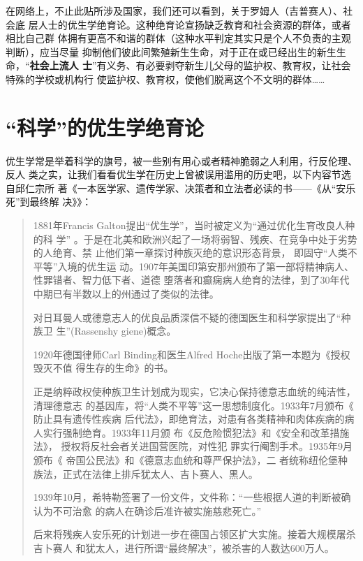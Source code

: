 在网络上，不止此贴所涉及国家，我们还可以看到，关于罗姆人（吉普赛人）、社会底
层人士的优生学绝育论。这种绝育论宣扬缺乏教育和社会资源的群体，或者相比自己群
体拥有更高不和谐的群体（这种水平判定其实只是个人不负责的主观判断），应当尽量
抑制他们彼此间繁殖新生生命，对于正在或已经出生的新生生命，“\textbf{社会上流人
  士}”有义务、有必要剥夺新生儿父母的监护权、教育权，让社会特殊的学校或机构行
使监护权、教育权，使他们脱离这个不文明的群体……

\section{“科学”的优生学绝育论}

优生学常是举着科学的旗号，被一些别有用心或者精神脆弱之人利用，行反伦理、反人
类之实，让我们看看优生学在历史上曾被误用滥用的历史吧，以下内容节选自邱仁宗所
著《一本医学家、遗传学家、决策者和立法者必读的书——《从“安乐死”到最终解
决》》\cite{yousheng}：

\begin{quotation}
  1881年Francis Galton提出“优生学”，当时被定义为“通过优化生育改良人种的科
  学” 。于是在北美和欧洲兴起了一场将弱智、残疾、在竞争中处于劣势的人绝育、禁
  止他们第一章探讨种族灭绝的意识形态背景， 即固守“人类不平等”入境的优生运
  动。1907年美国印第安那州颁布了第一部将精神病人、性罪错者、智力低下者、道德
  堕落者和癫痫病人绝育的法律，到了30年代中期已有半数以上的州通过了类似的法律。

  对日耳曼人或德意志人的优良品质深信不疑的德国医生和科学家提出了“种族卫
  生”(Rassenshy giene)概念。

  1920年德国律师Carl Binding和医生Alfred Hoche出版了第一本题为《授权毁灭不值
  得生存的生命》的书。

  正是纳粹政权使种族卫生计划成为现实，它决心保持德意志血统的纯洁性，清理德意志
  的基因库，将“人类不平等”这一思想制度化。1933年7月颁布《 防止具有遗传性疾病
  后代法》，即绝育法，对患有各类精神和肉体疾病的病人实行强制绝育。1933年11月颁
  布《反危险惯犯法》和《安全和改革措施法》， 授权将反社会者关进国营医院，对性犯
  罪实行阉割手术。1935年9月颁布《 帝国公民法》和《德意志血统和尊严保护法》，二
  者统称纽伦堡种族法，正式在法律上排斥犹太人、吉卜赛人、黑人。

  1939年10月，希特勒签署了一份文件，文件称：“一些根据人道的判断被确认为不可治愈
  的病人在确诊后准许被实施慈悲死亡。”

  后来将残疾人安乐死的计划进一步在德国占领区扩大实施。接着大规模屠杀吉卜赛人
  和犹太人，进行所谓“最终解决”，被杀害的人数达600万人。
\end{quotation}

